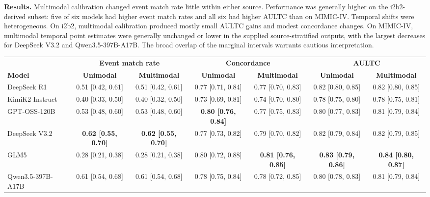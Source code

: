 \vspace{2mm}\noindent
\textbf{Results.} Multimodal calibration changed event match rate little within either source. Performance was generally higher on the i2b2-derived subset: five of six models had higher event match rates and all six had higher AULTC than on MIMIC-IV. Temporal shifts were heterogeneous. On i2b2, multimodal calibration produced mostly small AULTC gains and modest concordance changes. On MIMIC-IV, multimodal temporal point estimates were generally unchanged or lower in the supplied source-stratified outputs, with the largest decreases for DeepSeek V3.2 and Qwen3.5-397B-A17B. The broad overlap of the marginal intervals warrants cautious interpretation.

\par\medskip
\noindent\begin{minipage}{\textwidth}
\centering
\scriptsize
\begin{adjustbox}{max width=\textwidth}
\begin{tabular}{@{}lcccccc@{}}
\toprule
& \multicolumn{2}{c}{\textbf{Event match rate}} & \multicolumn{2}{c}{\textbf{Concordance}} & \multicolumn{2}{c}{\textbf{AULTC}} \\
\cmidrule(lr){2-3}\cmidrule(lr){4-5}\cmidrule(l){6-7}
\textbf{Model} & \textbf{Unimodal} & \textbf{Multimodal} & \textbf{Unimodal} & \textbf{Multimodal} & \textbf{Unimodal} & \textbf{Multimodal} \\
\midrule
DeepSeek R1 & 0.51 [0.42, 0.61] & 0.51 [0.42, 0.61] & 0.77 [0.71, 0.84] & 0.77 [0.70, 0.83] & 0.82 [0.80, 0.85] & 0.82 [0.80, 0.85] \\
KimiK2-Instruct & 0.40 [0.33, 0.50] & 0.40 [0.32, 0.50] & 0.73 [0.69, 0.81] & 0.74 [0.70, 0.80] & 0.78 [0.75, 0.80] & 0.78 [0.75, 0.81] \\
GPT-OSS-120B & 0.53 [0.48, 0.60] & 0.53 [0.48, 0.60] & \textbf{0.80 [0.76, 0.84]} & 0.77 [0.75, 0.83] & 0.80 [0.77, 0.83] & 0.81 [0.79, 0.84] \\
DeepSeek V3.2 & \textbf{0.62 [0.55, 0.70]} & \textbf{0.62 [0.55, 0.70]} & 0.77 [0.73, 0.82] & 0.79 [0.70, 0.82] & 0.82 [0.79, 0.84] & 0.82 [0.79, 0.85] \\
GLM5 & 0.28 [0.21, 0.38] & 0.28 [0.21, 0.38] & 0.80 [0.72, 0.88] & \textbf{0.81 [0.76, 0.85]} & \textbf{0.83 [0.79, 0.86]} & \textbf{0.84 [0.80, 0.87]} \\
Qwen3.5-397B-A17B & 0.61 [0.54, 0.68] & 0.61 [0.54, 0.68] & 0.78 [0.75, 0.84] & 0.78 [0.72, 0.85] & 0.80 [0.78, 0.83] & 0.81 [0.79, 0.84] \\

\end{tabular}
\end{adjustbox}
\end{minipage}
